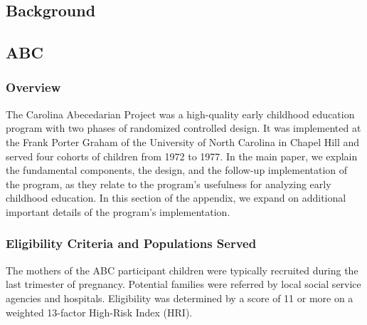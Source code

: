 \begin{appendices}
\setcounter{figure}{0}  \renewcommand{\thefigure}{A.\arabic{figure}}
\setcounter{table}{0}   \renewcommand{\thetable}{A.\arabic{table}}

\section{Background}

\subsection{ABC}

\subsubsection{Overview}

\noindent The Carolina Abecedarian Project was a high-quality early childhood education program with two phases of randomized controlled design. It was implemented at the Frank Porter Graham of the University of North Carolina in Chapel Hill and served four cohorts of children from 1972 to 1977. In the main paper, we explain the fundamental components, the design, and the follow-up implementation of the program, as they relate to the program's usefulness for analyzing early childhood education. In this section of the appendix, we expand on additional important details of the program's implementation.

\subsubsection{Eligibility Criteria and Populations Served}

\noindent The mothers of the ABC participant children were typically recruited during the last trimester  of pregnancy. Potential families were referred by local social service agencies and hospitals. Eligibility was determined by a score of 11 or more on a weighted 13-factor High-Risk Index (HRI).\\ 


\end{appendices}
